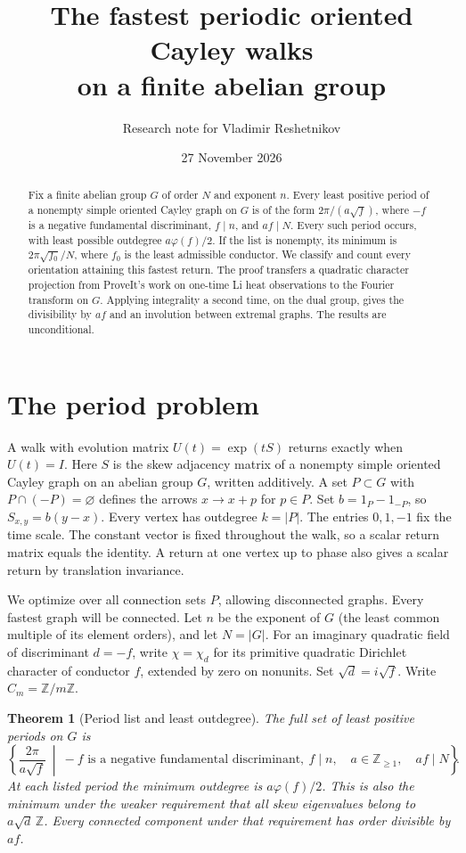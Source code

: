 \documentclass[11pt]{article}
\title{The fastest periodic oriented Cayley walks\\on a finite abelian group}
\author{Research note for Vladimir Reshetnikov}
\date{27 November 2026}
\newtheorem{theorem}{Theorem}[section]
\newcommand{\Z}{\mathbb Z}\newcommand{\Q}{\mathbb Q}\newcommand{\C}{\mathbb C}
\begin{document}
\maketitle
\begin{abstract}
Fix a finite abelian group $G$ of order $N$ and exponent $n$. Every least positive period of a nonempty simple oriented Cayley graph on $G$ is of the form $2\pi/(a\sqrt f)$, where $-f$ is a negative fundamental discriminant, $f\mid n$, and $af\mid N$. Every such period occurs, with least possible outdegree $a\varphi(f)/2$. If the list is nonempty, its minimum is $2\pi\sqrt{f_0}/N$, where $f_0$ is the least admissible conductor. We classify and count every orientation attaining this fastest return. The proof transfers a quadratic character projection from ProveIt's work on one-time Li heat observations to the Fourier transform on $G$. Applying integrality a second time, on the dual group, gives the divisibility by $af$ and an involution between extremal graphs. The results are unconditional.
\end{abstract}

\section{The period problem}
A walk with evolution matrix $U(t)=\exp(tS)$ returns exactly when $U(t)=I$. Here $S$ is the skew adjacency matrix of a nonempty simple oriented Cayley graph on an abelian group $G$, written additively. A set $P\subset G$ with $P\cap(-P)=\varnothing$ defines the arrows $x\to x+p$ for $p\in P$. Set $b=1_P-1_{-P}$, so $S_{x,y}=b(y-x)$. Every vertex has outdegree $k=|P|$. The entries $0,1,-1$ fix the time scale. The constant vector is fixed throughout the walk, so a scalar return matrix equals the identity. A return at one vertex up to phase also gives a scalar return by translation invariance.

We optimize over all connection sets $P$, allowing disconnected graphs. Every fastest graph will be connected. Let $n$ be the exponent of $G$ (the least common multiple of its element orders), and let $N=|G|$. For an imaginary quadratic field of discriminant $d=-f$, write $\chi=\chi_d$ for its primitive quadratic Dirichlet character of conductor $f$, extended by zero on nonunits. Set $\sqrt d=i\sqrt f$. Write $C_m=\Z/m\Z$.

\begin{theorem}[Period list and least outdegree]\label{thm:main}
The full set of least positive periods on $G$ is
\[
 \left\{\frac{2\pi}{a\sqrt f}\ \middle|\ -f\text{ is a negative fundamental discriminant},\
      f\mid n,\quad a\in\Z_{\ge1},\quad af\mid N\right\}.
\]
At each listed period the minimum outdegree is $a\varphi(f)/2$. This is also the minimum under the weaker requirement that all skew eigenvalues belong to $a\sqrt d\,\Z$. Every connected component under that requirement has order divisible by $af$.
\end{theorem}
\end{document}
